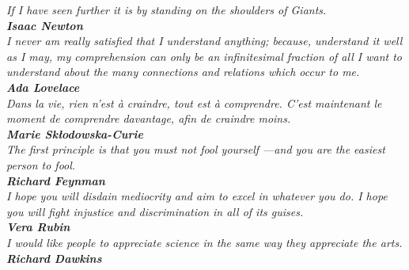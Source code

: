 \cleardoublepage\thispagestyle{empty}
\vspace{10cm}\hspace{5cm}
\parbox{12cm}{\sffamily\itshape\Large
	If I have seen further it is by standing on the shoulders of Giants.\\[10pt]
	\textup{\textbf{Isaac Newton}}\\[35pt]
	I never am really satisfied that I understand anything; because, understand it well as I may, my comprehension can only be an infinitesimal fraction of all I want to understand about the many connections and relations which occur to me.\\[10pt]
	\textup{\textbf{Ada Lovelace}}\\[35pt]
	Dans la vie, rien n'est à craindre, tout est à comprendre. C'est maintenant le moment de comprendre davantage, afin de craindre moins.\\[10pt]
	\textup{\textbf{Marie Skłodowska-Curie}}\\[35pt]
	The first principle is that you must not fool yourself ---and you are the easiest person to fool.\\[10pt]
	\textup{\textbf{Richard Feynman}}\\[35pt]
	I hope you will disdain mediocrity and aim to excel in whatever you do. I hope you will fight injustice and discrimination in all of its guises.\\[10pt]
	\textup{\textbf{Vera Rubin}}\\[35pt]
	I would like people to appreciate science in the same way they appreciate the arts.\\[10pt]
	\textup{\textbf{Richard Dawkins}}}
